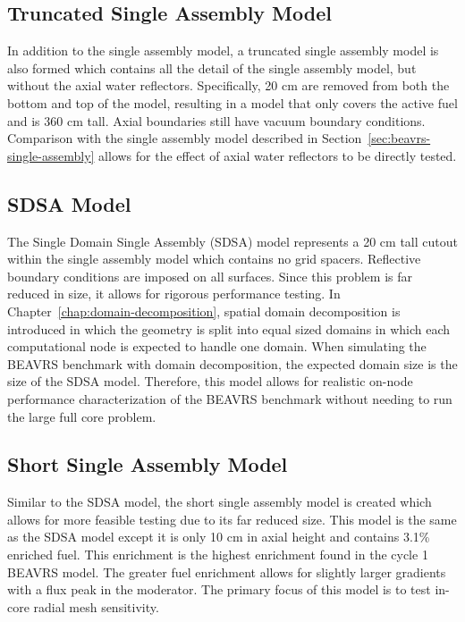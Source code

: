 \subsection{Truncated Single Assembly Model}
\label{sec:trunc-single-assembly}

In addition to the single assembly model, a truncated single assembly model is also formed which contains all the detail of the single assembly model, but without the axial water reflectors. Specifically, 20 cm are removed from both the bottom and top of the model, resulting in a model that only covers the active fuel and is 360 cm tall. Axial boundaries still have vacuum boundary conditions. Comparison with the single assembly model described in Section~\ref{sec:beavrs-single-assembly} allows for the effect of axial water reflectors to be directly tested.

\subsection{SDSA Model}
\label{sec:sdsa}

The Single Domain Single Assembly (SDSA) model represents a 20 cm tall cutout within the single assembly model which contains no grid spacers. Reflective boundary conditions are imposed on all surfaces. Since this problem is far reduced in size, it allows for rigorous performance testing. In Chapter~\ref{chap:domain-decomposition}, spatial domain decomposition is introduced in which the geometry is split into equal sized domains in which each computational node is expected to handle one domain. When simulating the BEAVRS benchmark with domain decomposition, the expected domain size is the size of the SDSA model. Therefore, this model allows for realistic on-node performance characterization of the BEAVRS benchmark without needing to run the large full core problem.

\subsection{Short Single Assembly Model}
\label{sec:short-single-assembly}

Similar to the SDSA model, the short single assembly model is created which allows for more feasible testing due to its far reduced size. This model is the same as the SDSA model except it is only 10 cm in axial height and contains 3.1\% enriched fuel. This enrichment is the highest enrichment found in the cycle 1 BEAVRS model. The greater fuel enrichment allows for slightly larger gradients with a flux peak in the moderator. The primary focus of this model is to test in-core radial mesh sensitivity.


